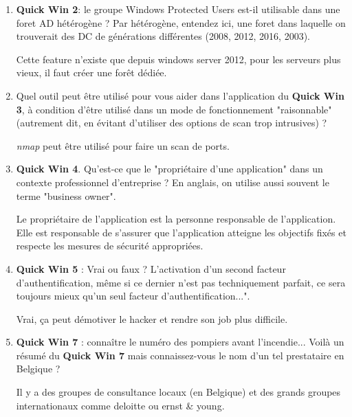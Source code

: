 \documentclass[a4paper]{article}
\begin{document}
\begin{enumerate}



\item \textbf{Quick Win 2}: le groupe Windows Protected Users est-il utilisable dans une foret AD hétérogène ? Par hétérogène, entendez ici, une foret dans laquelle on trouverait des DC de générations différentes (2008, 2012, 2016, 2003).
\begin{example}
    Cette feature n'existe que depuis windows server 2012, pour les serveurs plus vieux, il faut créer une forêt dédiée.
\end{example}



\item Quel outil peut être utilisé pour vous aider dans l'application du \textbf{Quick Win 3}, à condition d'être utilisé dans un mode de fonctionnement "raisonnable" (autrement dit, en évitant d'utiliser des options de scan trop intrusives) ?
\begin{example}
    \textit{nmap} peut être utilisé pour faire un scan de ports.
\end{example}



\item \textbf{Quick Win 4}. Qu'est-ce que le "propriétaire d'une application" dans un contexte professionnel d'entreprise ? En anglais, on utilise aussi souvent le terme "business owner".
\begin{example}
    Le propriétaire de l'application est la personne responsable de l'application. Elle est responsable de s'assurer que l'application atteigne les objectifs fixés et respecte les mesures de sécurité appropriées.
\end{example}



\item \textbf{Quick Win 5} : Vrai ou faux ? L'activation d'un second facteur d'authentification, même si ce dernier n'est pas techniquement parfait, ce sera toujours mieux qu'un seul facteur d'authentification...".
\begin{example}
    Vrai, ça peut démotiver le hacker et rendre son job plus difficile.
\end{example}



\item \textbf{Quick Win 7} : connaître le numéro des pompiers avant l'incendie... Voilà un résumé du \textbf{Quick Win 7} mais connaissez-vous le nom d'un tel prestataire en Belgique ?
\begin{example}
    Il y a des groupes de consultance locaux (en Belgique) et des grands groupes internationaux comme deloitte ou ernst \& young.
\end{example}




\end{enumerate}
\end{document}
